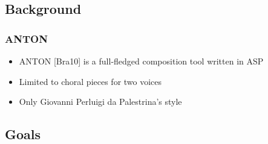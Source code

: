 \documentclass[english]{beamer}
\begin{document}
\subsection{Background}
\begin{frame}
	\frametitle{ANTON}
	\begin{itemize}
		\item ANTON [Bra10] is a full-fledged composition tool written in ASP
		\item Limited to choral pieces for two voices
		\item Only Giovanni Perluigi da Palestrina's style
	\end{itemize}
\end{frame}

\subsection{Goals}
\end{document}
